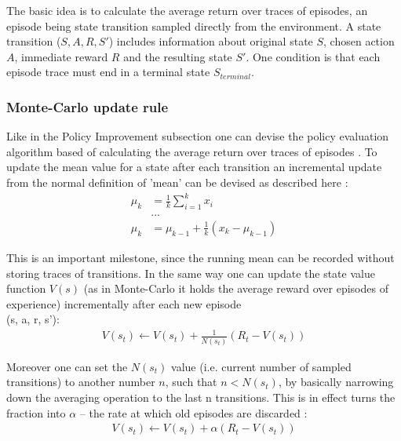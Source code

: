The basic idea is to calculate the average return over traces of episodes, an episode being state transition sampled directly from the environment. A state transition ($S, A, R, S'$) includes information about original state $S$, chosen action $A$, immediate reward $R$ and the resulting state $S'$. One condition is that each episode trace must end in a terminal state $S_{terminal}$. 

\subsubsection{Monte-Carlo update rule}

Like in the Policy Improvement subsection one can devise the policy evaluation algorithm based of calculating the average return over traces of episodes \cite{lecture_mfl}. 
To update the mean value for a state after each transition an incremental update from the normal definition of 'mean' can be devised as described here \cite{lecture_mfl} :
\begin{align}
    \mu_k &= \frac{1}{k}\sum^{k}_{i = 1} x_i \nonumber \\
    &... \nonumber \\
    \mu_k &= \mu_{k - 1} + \frac{1}{k} (x_k - \mu_{k - 1})
\end{align}

This is an important milestone, since the running mean can be recorded without storing traces of transitions. In the same way one can update the state value function $V(s)$ (as in Monte-Carlo it holds the average reward over episodes of experience) incrementally after each new episode \\(s, a, r, s'):
\begin{align}
    V(s_t) \longleftarrow V(s_t) + \frac{1}{N(s_t)}(R_t - V(s_t))
\end{align}

Moreover one can set the $N(s_t)$ value (i.e. current number of sampled transitions) to another number $n$, such that $n < N(s_t)$, by basically narrowing down the averaging operation to the last n transitions. This is in effect turns the fraction into $\alpha$ -- the rate at which old episodes are discarded \cite{lecture_mfl}:
\begin{align}
    V(s_t) \longleftarrow V(s_t) + \alpha (R_t - V(s_t)) \label{eq:mc_increment}
\end{align}

